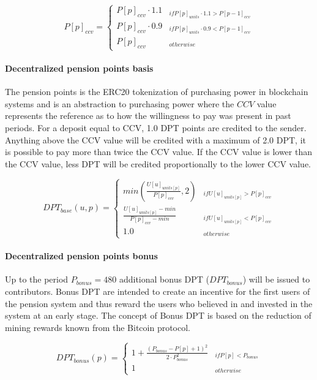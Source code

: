 \begin{equation}
P[p]_{ccv} = \begin{cases} 
P[p]_{ccv} \cdot 1.1 & _{if P[p]_{units} \cdot 1.1 > P[p-1]_{ccv}} \\
P[p]_{ccv} \cdot 0.9 & _{if P[p]_{units} \cdot 0.9 < P[p-1]_{ccv}} \\
P[p]_{ccv} & _{otherwise}
\end{cases}
\end{equation}

\paragraph{Decentralized pension points basis}
The pension points is the ERC20 tokenization of purchasing power in blockchain systems and is an abstraction to purchasing power where the $CCV$ value represents the reference as to how the willingness to pay was present in past periods. For a deposit equal to CCV, 1.0 DPT points are credited to the sender. Anything above the CCV value will be credited with a maximum of 2.0 DPT, it is possible to pay more than twice the CCV value. If the CCV value is lower than the CCV value, less DPT will be credited proportionally to the lower CCV value.

\begin{dmath}
DPT_{base}(u, p) = \begin{cases} 
min(\frac{U[u]_{units[p]}} {P[p]_{ccv}}, 2) 
  & _{if U[u]_{units[p]} > P[p]_{ccv}} \\
\frac{U[u]_{units[p]} - min} {P[p]_{ccv} - min} 
  & _{if U[u]_{units[p]} < P[p]_{ccv}} \\
1.0 & _{otherwise}
\end{cases}
\end{dmath}

\paragraph{Decentralized pension points bonus}
Up to the period $P_{bonus} = 480$ additional bonus DPT ($DPT_{bonus}$) will be issued to contributors. Bonus DPT are intended to create an incentive for the first users of the pension system and thus reward the users who believed in and invested in the system at an early stage. The concept of Bonus DPT is based on the reduction of mining rewards known from the Bitcoin protocol.

\begin{equation}
DPT_{bonus}(p) = \begin{cases} 
1 + \frac{(P_{bonus} - P[p] + 1)^2}
      {2 \cdot P_{bonus}^2} & _{if P[p] < P_{bonus}} \\
1 & _{otherwise} 
\end{cases}
\end{equation}